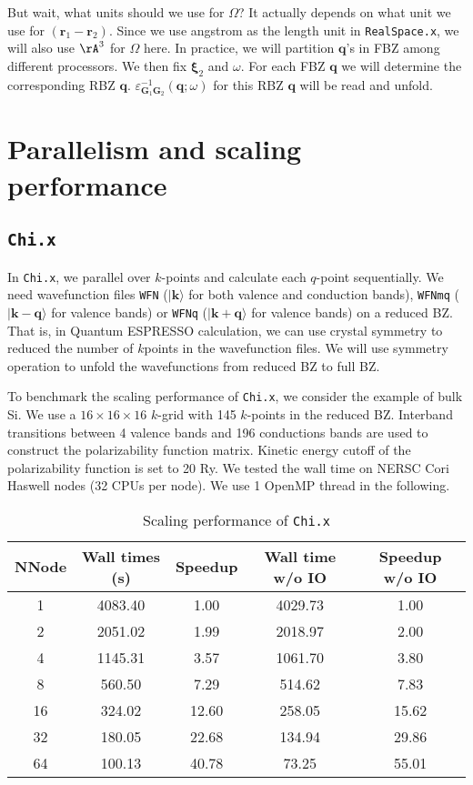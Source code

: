 \documentclass[11pt, oneside]{article}          %
\begin{document}
But wait, what units should we use for $\Omega$? It actually depends on what unit we use for $({\bm r}_1 - {\bm r}_2)$. Since we use angstrom as the length unit in {\tt RealSpace.x}, we will also use ${\tt \AA}^{3}$ for $\Omega$ here. In practice, we will partition ${\bm q}$'s in FBZ among different processors. We then fix ${\bm \xi}_2$ and $\omega$. For each FBZ ${\bm q}$ we will determine the corresponding RBZ ${\bm q}$. $\varepsilon^{-1}_{{\bm G}_1 {\bm G}_2} ({\bm q}; \omega)$ for this RBZ ${\bm q}$ will be read and unfold.

\section{Parallelism and scaling performance}

\subsection{{\tt Chi.x}}

In {\tt Chi.x}, we parallel over $k$-points and calculate each $q$-point sequentially. We need wavefunction files {\tt WFN} ($| {\bm k} \rangle$ for both valence and conduction bands), {\tt WFNmq} ($| {\bm k} - {\bm q} \rangle$ for valence bands) or {\tt WFNq} ($| {\bm k} + {\bm q} \rangle$ for valence bands) on a reduced BZ. That is, in Quantum ESPRESSO calculation, we can use crystal symmetry to reduced the number of $k$points in the wavefunction files. We will use symmetry operation to unfold the wavefunctions from reduced BZ to full BZ.

To benchmark the scaling performance of {\tt Chi.x}, we consider the example of bulk Si. We use a $16 \times 16 \times 16$ $k$-grid with 145 $k$-points in the reduced BZ. Interband transitions between 4 valence bands and 196 conductions bands are used to construct the polarizability function matrix. Kinetic energy cutoff of the polarizability function is set to 20 Ry. We tested the wall time on NERSC Cori Haswell nodes (32 CPUs per node). We use 1 OpenMP thread in the following.

\begin{table}[!htbp]
  \centering
  \begin{tabular}{| c | c | c | c | c |}
    \hline
    NNode & Wall times (s) & Speedup & Wall time w/o IO & Speedup w/o IO \\ 
    \hline
    1  & 4083.40 & 1.00  & 4029.73 & 1.00 \\
    2  & 2051.02 & 1.99  & 2018.97 & 2.00 \\
    4  & 1145.31 & 3.57  & 1061.70 & 3.80 \\
    8  & 560.50  & 7.29  & 514.62  & 7.83 \\
    16 & 324.02  & 12.60 & 258.05  & 15.62 \\
    32 & 180.05  & 22.68 & 134.94  & 29.86 \\
    64 & 100.13  & 40.78 & 73.25   & 55.01 \\
    \hline
  \end{tabular}
  \caption{Scaling performance of {\tt Chi.x}}
  \label{tab:Scaling_Chi}
\end{table}
\end{document}
